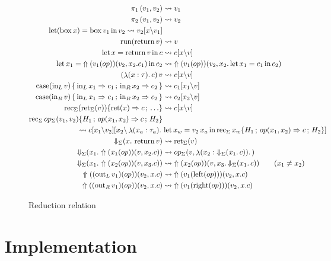 \documentclass[acmsmall, screen, nonacm]{acmart}
\theoremstyle{definition}
\newcommand{\reflectname}{\Uparrow}
\newcommand{\performraw}[2]{\mathop{\reflectname(#1(#2))}}
\newcommand{\perform}[5]{\performraw{#1}{#2}(#3, #4. #5)}
\newcommand{\reifyname}{\Downarrow}
\newcommand{\reifyraw}[1]{\mathop{\reifyname_{#1}}}
\newcommand{\reify}[3]{\reifyraw{#1}(#2.\,#3)}
\newcommand{\outl}[1]{\mathop{\mathrm{out}_L} #1}
\newcommand{\outr}[1]{\mathop{\mathrm{out}_R} #1}
\newcommand{\indintro}[4]{#2_{#1}(#3, #4)}
\newcommand{\retname}{\mathrm{ret}}
\newcommand{\ret}[2]{\mathop{\retname_{#1}}(#2)}
\newcommand{\indelim}[3]{\mathop{\mathrm{rec}_{#1}} #2 \{#3\}}
\newcommand{\indretcase}[2]{\retname(#1) \Rightarrow #2}
\newcommand{\indcase}[4]{#1(#2, #3) \Rightarrow #4}
\newcommand{\seq}{\,;\,}
\newcommand{\fst}{\mathop{\pi_1}}
\newcommand{\snd}{\mathop{\pi_2}}
\newcommand{\inl}[1]{\mathop{\mathrm{in}_L} #1}
\newcommand{\inr}[1]{\mathop{\mathrm{in}_R} #1}
\newcommand{\case}[5]{\mathop{\mathrm{case}} #1 \,\{\,\inl{#2} \Rightarrow #3 \seq \inr{#4} \Rightarrow #5 \,\}}
\newcommand{\abs}[3]{\mathop{\lambda}(#1 \types #2).\,#3}
\newcommand{\app}[2]{#1\,#2}
\newcommand{\types}{\mathrel{:}}
\newcommand{\return}[1]{\mathop{\mathrm{return}} #1}
\newcommand{\letv}[3]{\mathop{\mathrm{let}} #1 = #2 \mathop{\mathrm{in}} #3}
\newcommand{\gbox}[1]{\mathop{\mathrm{box}} #1}
\newcommand{\gunbox}[4]{\mathop{\mathrm{let}} (\gbox #1) = #2 \mathop{\mathrm{in}} #3}
\newcommand{\grun}[1]{\mathop{\mathrm{run}}(#1)}
\newcommand{\sbst}[3]{#1[#2\backslash#3]}
\newcommand{\reducesto}{\rightsquigarrow}
\begin{document}
\begin{figure}
\begin{align*}
\fst{(v_1, v_2)} &\reducesto v_1 \\
\snd{(v_1, v_2)} &\reducesto v_2 \\
\gunbox{x}{\gbox{v_1}}{v_2} &\reducesto \sbst{v_2}{x}{v_1} \\
\grun{\return{v}} &\reducesto v \\
\letv{x}{\return{v}}{c} &\reducesto \sbst{c}{x}{v} \\
\letv{x_1}{\perform{v_1}{op}{v_2}{x_2}{c_1}}{c_2} &\reducesto \perform{v_1}{op}{v_2}{x_2}{\letv{x_1}{c_1}{c_2}} \\
\app{(\abs{x}{\tau}{c})}{v} &\reducesto \sbst{c}{x}{v} \\
\case{(\inl{v})}{x_1}{c_1}{x_2}{c_2} &\reducesto \sbst{c_1}{x_1}{v} \\
\case{(\inr{v})}{x_1}{c_1}{x_2}{c_2} &\reducesto \sbst{c_2}{x_2}{v} \\
\indelim{\Sigma}{(\ret{\Sigma}{v})}{\indretcase{x}{c} \seq \ldots} &\reducesto \sbst{c}{x}{v} \\
\indelim{\Sigma}{\indintro{\Sigma}{op}{v_1}{v_2}}{H_1 \seq \indcase{op}{x_1}{x_2}{c} \seq H_2} \\
  \reducesto \sbst{\sbst{c}{x_1}{v_2}}{x_2}{\abs{x_a}{\tau_a}{&\letv{x_w}{\app{v_2}{x_a}}{\indelim{\Sigma}{x_w}{H_1 \seq \indcase{op}{x_1}{x_2}{c} \seq H_2}}}} \\
\reify{\Sigma}{x}{\return{v}} &\reducesto \ret{\Sigma}{v} \\
\reify{\Sigma}{x_1}{\perform{x_1}{op}{v}{x_2}{c}} &\reducesto \indintro{\Sigma}{op}{v}{\abs{x_2}{\reify{\Sigma}{x_1}{c}}} \\
\reify{\Sigma}{x_1}{\perform{x_2}{op}{v}{x_3}{c}} &\reducesto \perform{x_2}{op}{v}{x_3}{\reify{\Sigma}{x_1}{c}} \qquad (x_1 \neq x_2) \\
\perform{(\outl{v_1})}{op}{v_2}{x}{c} &\reducesto \perform{v_1}{\mathrm{left}(op)}{v_2}{x}{c} \\
\perform{(\outr{v_1})}{op}{v_2}{x}{c} &\reducesto \perform{v_1}{\mathrm{right}(op)}{v_2}{x}{c}
\end{align*}
\caption{Reduction relation}
\label{fig:reduction}
\end{figure}

\section{Implementation}
\label{sec:implementation}
\end{document}
